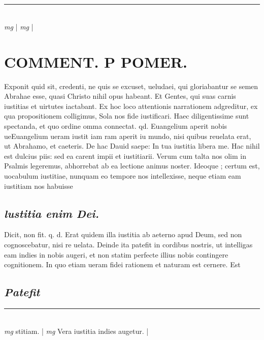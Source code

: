 \documentclass{article}
\begin{document}
\begin{pages}
\subsection*{\textit{}}
\vspace{0.5cm}\noindent
\vspace{0.2cm}\rule{1cm}{0.2pt}\\ 
\hspace{0.2cm}\textit{mg}
\footnotesize 
\normalsize| 
\hspace{0.2cm}\textit{mg}
\footnotesize 
\normalsize| 
\section*{COMMENT. P POMER.  }\pstart Exponit quid sit, credenti, ne quis se excuset, ueludaei, qui gloriabantur se semen Abrahae esse, quasi Christo nihil opus habeant. Et Gentes, qui suas carnis iustitias et uirtutes iactabant. Ex hoc loco attentionis narrationem adgreditur, ex qua propositionem colligimus, Sola nos fide iustificari.   \pend\pstart Haec diligentissime sunt spectanda, et quo ordine omma connectat. qd. Euangelium aperit nobis ueEuangelium ueram iustit iam ram aperit iu   mundo, nisi quibus reuelata erat, ut Abrahamo, et caeteris. De hac Dauid saepe: In tua iustitia libera me.  Hac nihil est dulcius piis: sed ea carent impii et iustitiarii. Verum cum talta nos olim in Psalmis legeremus, abhorrebat ab ea lectione animus noster. Ideoque ; certum est, uocabulum iustitiae, nunquam eo tempore nos intellexisse, neque etiam eam iustitiam nos habuisse\pend
{}
{}
\subsection*{\textit{lustitia enim Dei. }}\pstart Dicit, non fit. q. d. Erat quidem illa iustitia ab aeterno apud Deum, sed non cognoscebatur, nisi re uelata. Deinde ita patefit in cordibus nostris, ut intelligas eam indies in nobis augeri, et non statim perfecte illius nobis contingere cognitionem. In quo etiam ueram fidei rationem et naturam est cernere. Est  \pend
{}
{}
\subsection*{\textit{Patefit }}
\vspace{0.5cm}\noindent
\vspace{0.2cm}\rule{1cm}{0.2pt}\\ 
\hspace{0.2cm}\textit{mg}
\footnotesize stitiam.  
\normalsize| 
\hspace{0.2cm}\textit{mg}
\footnotesize Vera iustitia indies augetur. 
\normalsize| 

\end{pages}
\end{document}
